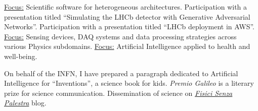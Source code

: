 \documentclass[
  a4paper, 
]{fortysecondscv}
\begin{document}


\begin{cvtable}[2]
        {\underline{Focus:} Scientific software for heterogeneous architectures.}
        {Participation with a presentation titled ``Simulating the LHCb detector with Generative Adversarial Networks''.}
        {Participation with a presentation titled ``LHCb deployment in AWS''.}
	    {\underline{Focus:} Sensing devices, DAQ systems and data processing strategies across various Physics subdomains.}
	    {\underline{Focus:} Artificial Intelligence applied to health and well-being.}
\end{cvtable}


\begin{cvtable}[2]
        {On behalf of the INFN, I have prepared a paragraph dedicated to Artificial Intelligence for ``Inventions'', a science book for kids.}
	    {\textit{Premio Galileo} is a literary prize for science communication.}
	    {Dissemination of science on \href{https://www.fisicisenzapalestra.com}{\textit{Fisici Senza Palestra}} blog.}
\end{cvtable}
\end{document}
